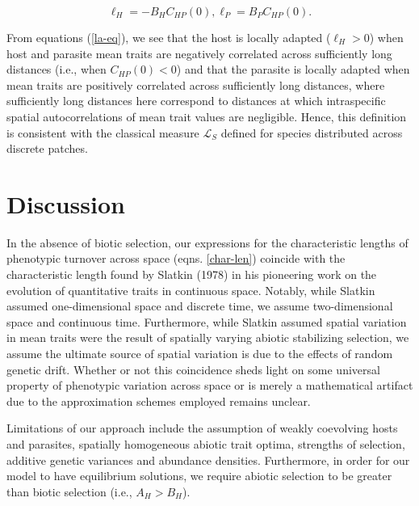 \documentclass{article}
\begin{document}
\begin{subequations}\label{la-eq}
  \begin{equation}
    \ell_H = -B_HC_{HP}(0),
  \end{equation}
  \begin{equation}
    \ell_P = B_PC_{HP}(0).
  \end{equation}
\end{subequations}

From equations (\ref{la-eq}), we see that the host is locally adapted
(\(\ell_H>0\)) when host and parasite mean traits are negatively
correlated across sufficiently long distances (i.e., when
\(C_{HP}(0)<0\)) and that the parasite is locally adapted when mean
traits are positively correlated across sufficiently long distances,
where sufficiently long distances here correspond to distances at which
intraspecific spatial autocorrelations of mean trait values are
negligible. Hence, this definition is consistent with the classical
measure \(\mathcal L_S\) defined for species distributed across discrete
patches.

\hypertarget{discussion}{%
\section{Discussion}\label{discussion}}

In the absence of biotic selection, our expressions for the
characteristic lengths of phenotypic turnover across space (eqns.
\ref{char-len}) coincide with the characteristic length found by Slatkin
(1978) in his pioneering work on the evolution of quantitative traits in
continuous space. Notably, while Slatkin assumed one-dimensional space
and discrete time, we assume two-dimensional space and continuous time.
Furthermore, while Slatkin assumed spatial variation in mean traits were
the result of spatially varying abiotic stabilizing selection, we assume
the ultimate source of spatial variation is due to the effects of random
genetic drift. Whether or not this coincidence sheds light on some
universal property of phenotypic variation across space or is merely a
mathematical artifact due to the approximation schemes employed remains
unclear.

Limitations of our approach include the assumption of weakly coevolving
hosts and parasites, spatially homogeneous abiotic trait optima,
strengths of selection, additive genetic variances and abundance
densities. Furthermore, in order for our model to have equilibrium
solutions, we require abiotic selection to be greater than biotic
selection (i.e., \(A_H>B_H\)).
\end{document}
